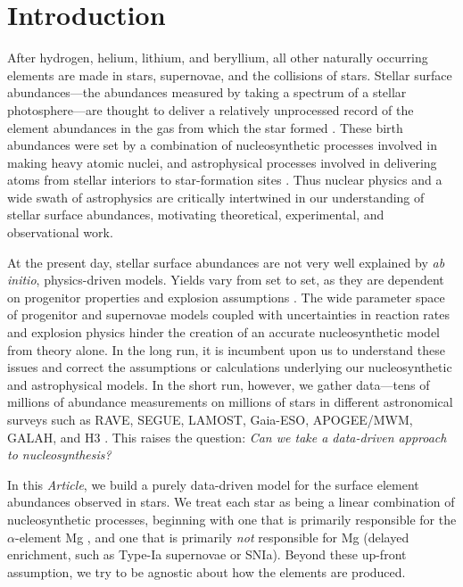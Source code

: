 \documentclass[modern]{aastex631}
\newcommand{\documentname}{\textsl{Article}}
\begin{document}
 
\section{Introduction}\label{sec:intro}

After hydrogen, helium, lithium, and beryllium, all other naturally occurring elements are made in stars, supernovae, and the collisions of stars.
Stellar surface abundances---the abundances measured by taking a spectrum of a stellar photosphere---are thought to deliver a relatively unprocessed record of the element abundances in the gas from which the star formed \citep[though see e.g.,][]{pinsonneault2001, oh2018, souto2019, vincenzo2021b}.
These birth abundances were set by a combination of nucleosynthetic processes involved in making heavy atomic nuclei, and astrophysical processes involved in delivering atoms from stellar interiors to star-formation sites \citep[e.g.,][]{johnsonja2020}.
Thus nuclear physics and a wide swath of astrophysics are critically intertwined in our understanding of stellar surface abundances, motivating theoretical, experimental, and observational work.

At the present day, stellar surface abundances are not very well explained by \textsl{ab initio}, physics-driven models.
Yields vary from set to set, as they are dependent on progenitor properties and explosion assumptions \citep[e.g.,][]{rybizki2017, griffith2021b}. 
The wide parameter space of progenitor and supernovae models coupled with uncertainties in reaction rates and explosion physics hinder the creation of an accurate nucleosynthetic model from theory alone.
In the long run, it is incumbent upon us to understand these issues and correct the assumptions or calculations underlying our nucleosynthetic and astrophysical models.
In the short run, however, we gather data---tens of millions of abundance measurements on millions of stars in different astronomical surveys such as RAVE, SEGUE, LAMOST, Gaia-ESO, APOGEE/MWM, GALAH, and H3 \citep{steinmetz2006, yanny2009, gilmore2012, desilva2015, luo2015, majewski2017, conroy2019}.
This raises the question: \emph{Can we take a data-driven approach to nucleosynthesis?}

In this \documentname{}, we build a purely data-driven model for the surface element abundances observed in stars.
We treat each star as being a linear combination of nucleosynthetic processes, beginning with one that is primarily responsible for the $\alpha$-element Mg \citep[prompt enrichment, such as core collapse supernovae or CCSN, e.g.,][]{andrews2017}, and one that is primarily \emph{not} responsible for Mg (delayed enrichment, such as Type-Ia supernovae or SNIa).
Beyond these up-front assumption, we try to be agnostic about how the elements are produced.
\end{document}
